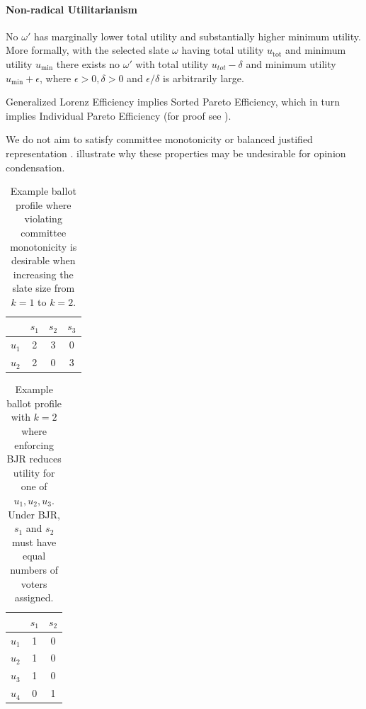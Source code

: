 \documentclass[11pt]{article}
\begin{document}
\paragraph{Non-radical Utilitarianism}
No $\omega'$ has marginally lower total utility and substantially higher minimum utility. More formally, with the selected slate $\omega$ having total utility $u_{\mathrm{tot}}$ and minimum utility $u_{\mathrm{min}}$ there exists no $\omega'$ with total utility $u_{tot} - \delta$ and minimum utility $u_{\mathrm{min}} + \epsilon$, where $\epsilon > 0, \delta > 0$ and $\epsilon/\delta$ is arbitrarily large.


Generalized Lorenz Efficiency implies Sorted Pareto Efficiency, which in turn implies Individual Pareto Efficiency (for proof see ). 

We do not aim to satisfy committee monotonicity \citep{elkind-committee-monotonicity} or balanced justified representation \citep{fish-v2}.  illustrate why these properties may be undesirable for opinion condensation.

\begin{table}[t]
\centering
\begin{tabular}{lccc}
\hline
 & $s_1$ & $s_2$ & $s_3$ \\
\hline
$u_1$ & 2 & 3 & 0 \\
$u_2$ & 2 & 0 & 3 \\
\hline
\end{tabular}
\caption{Example ballot profile where violating committee monotonicity is desirable when increasing the slate size from \(k=1\) to \(k=2\).}
\label{tab:committee-monotonicity-example}
\end{table}

\begin{table}[t]
\centering
\begin{tabular}{lcc}
\hline
 & $s_1$ & $s_2$ \\
\hline
$u_1$ & 1 & 0 \\
$u_2$ & 1 & 0 \\
$u_3$ & 1 & 0 \\
$u_4$ & 0 & 1 \\
\hline
\end{tabular}
\caption{Example ballot profile with \(k=2\) where enforcing BJR reduces utility for one of \(u_1,u_2,u_3\). Under BJR, \(s_1\) and \(s_2\) must have equal numbers of voters assigned.}
\label{tab:bjr-example}
\end{table}
\end{document}
